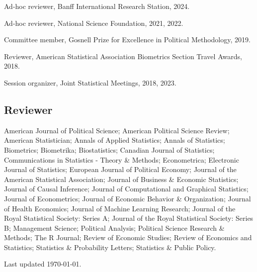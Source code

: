 \documentclass[10pt,letterpaper]{article}
\newenvironment{infolist}{
	\begin{list}{}{
		\setlength{\parskip}{0pt}
		\setlength{\itemsep}{4pt}
		\setlength{\parsep}{0.3em}
		\setlength{\leftmargin}{0em}
		\setlength{\labelwidth}{0em}
		}
	}{
\end{list}
}
\newcommand{\infoitem}[1]{\item {#1}}
\begin{document}
	\begin{infolist}
		\infoitem{Ad-hoc reviewer, Banff International Research Station, 2024.}
		\infoitem{Ad-hoc reviewer, National Science Foundation, 2021, 2022.}
		\infoitem{Committee member, Gosnell Prize for Excellence in Political Methodology, 2019.}
		\infoitem{Reviewer, American Statistical Association Biometrics Section Travel Awards, 2018.}
		\infoitem{Session organizer, Joint Statistical Meetings, 2018, 2023.}
	\end{infolist}

	\subsection*{Reviewer}

	\begin{infolist}
		\infoitem{American Journal of Political Science; American Political Science Review; American Statistician; Annals of Applied Statistics; Annals of Statistics; Biometrics; Biometrika; Biostatistics; Canadian Journal of Statistics; Communications in Statistics - Theory \& Methods; Econometrica; Electronic Journal of Statistics; European Journal of Political Economy; Journal of the American Statistical Association; Journal of Business \& Economic Statistics; Journal of Causal Inference; Journal of Computational and Graphical Statistics; Journal of Econometrics; Journal of Economic Behavior \& Organization; Journal of Health Economics; Journal of Machine Learning Research; Journal of the Royal Statistical Society: Series A; Journal of the Royal Statistical Society: Series B; Management Science; Political Analysis; Political Science Research \& Methods; The R Journal; Review of Economic Studies; Review of Economics and Statistics; Statistics \& Probability Letters; Statistics \& Public Policy.}
	\end{infolist}

	\bigskip
	{\small Last updated \today.}
\end{document}
